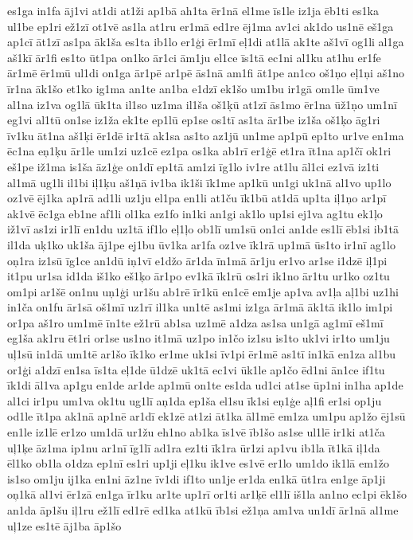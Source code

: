 {es1ga
in1fa
āj1vi
at1di
at1ži
ap1bā
ah1ta
ēr1nā
el1me
īs1le
iz1ja
ēb1ti
es1ka
ul1be
ep1ri
ež1zī
ot1vē
as1la
at1ru
er1mā
ed1re
ēj1ma
av1ci
ak1do
us1nē
eš1ga
ap1cī
āt1zī
as1pa
āk1ša
es1ta
ib1lo
er1ģi
ēr1mī
eļ1di
at1lā
ak1te
aš1vī
og1li
al1ga
aš1kī
ār1fi
es1to
ūt1pa
on1ko
ār1ci
ām1ju
el1ce
īs1tā
ec1ni
al1ku
at1hu
er1fe
ār1mē
ēr1mū
ul1di
on1ga
ār1pē
ar1pē
ās1nā
am1fi
āt1pe
an1co
oš1ņo
eļ1ņi
aš1no
īr1na
āk1šo
et1ko
ig1ma
an1te
an1ba
e1dzī
ek1šo
um1bu
ir1gā
om1le
ūm1ve
al1na
iz1va
og1lā
ūk1ta
il1so
uz1ma
il1ša
oš1ķū
at1zī
ās1mo
ēr1na
ūž1ņo
um1nī
eg1vi
al1tū
on1se
iz1ža
ek1te
ep1lū
ep1se
os1tī
as1ta
ār1be
iz1ša
oš1ķo
āg1ri
īv1ku
āt1na
aš1ķi
ēr1dē
ir1tā
ak1sa
as1to
az1jū
un1me
ap1pū
ep1to
ur1ve
en1ma
ēc1na
eņ1ķu
ār1le
um1zi
uz1cē
ez1pa
os1ka
ab1rī
er1ģē
et1ra
īt1na
ap1čī
ok1ri
eš1pe
iž1ma
is1ša
āz1ģe
on1dī
ep1tā
am1zi
īg1lo
iv1re
at1lu
āl1ci
ez1vā
iz1ti
al1mā
ug1li
il1bi
iļ1ķu
aš1ņā
iv1ba
ik1ši
īk1me
ap1kū
un1gi
uk1nā
al1vo
up1lo
oz1vē
ēj1ka
ap1rā
ad1li
uz1ju
el1pa
en1li
at1ču
īk1bū
at1dā
up1ta
iļ1ņo
ar1pī
ak1vē
ēc1ga
eb1ne
af1li
ol1ka
ez1fo
in1ki
an1gi
ak1lo
up1si
ej1va
ag1tu
ek1ļo
iž1vī
as1zi
ir1lī
en1du
uz1tā
if1lo
eļ1ļo
ob1lī
um1sū
on1ci
an1de
es1lī
ēb1si
ib1tā
il1da
uķ1ko
uk1ša
āj1pe
ej1bu
ūv1ka
ar1fa
oz1ve
īk1rā
up1mā
ūs1to
ir1nī
ag1lo
oņ1ra
iz1sū
īg1ce
an1dū
iņ1vī
e1džo
ār1da
īn1mā
ār1ju
er1vo
ar1se
i1dzē
iļ1pi
it1pu
ur1sa
id1da
iš1ko
eš1ķo
ār1po
ev1kā
īk1rū
os1ri
ik1no
ār1tu
ur1ko
oz1tu
om1pi
ar1šē
on1nu
uņ1ģi
ur1šu
ab1rē
īr1kū
en1cē
em1je
ap1va
av1ļa
aļ1bi
uz1hi
in1ča
on1fu
ār1sā
oš1mī
uz1rī
il1ka
un1tē
as1mi
iz1ga
ār1mā
āk1tā
ik1lo
im1pi
or1pa
aš1ro
um1mē
īn1te
ež1rū
ab1sa
uz1mē
a1dza
as1sa
un1gā
ag1mī
eš1mī
eg1ša
ak1ru
ēt1ri
or1se
us1no
it1mā
uz1po
in1čo
iz1su
is1to
uk1vi
ir1to
um1ju
uļ1sū
in1dā
um1tē
ar1šo
īk1ko
er1me
uk1si
īv1pi
ēr1mē
as1tī
in1kā
en1za
al1bu
or1ģi
a1dzī
en1sa
īs1ta
eļ1de
ū1dzē
uk1tā
ec1vi
ūk1le
ap1čo
ēd1ni
ān1ce
if1tu
īk1di
āl1va
ap1gu
en1de
ar1de
ap1mū
on1te
es1da
ud1ci
at1se
ūp1ni
in1ha
ap1de
al1ci
ir1pu
um1va
ok1tu
ug1lī
aņ1da
ep1ša
el1su
īk1si
eņ1ģe
aļ1fi
er1si
op1ju
od1le
īt1pa
ak1nā
ap1nē
ar1dī
ek1zē
at1zi
āt1ka
āl1mē
em1za
um1pu
ap1žo
ēj1sū
en1le
iz1lē
er1zo
um1dā
ur1žu
eh1no
ab1ka
īs1vē
īb1šo
as1se
ul1lē
ir1ki
at1ča
uļ1ķe
āz1ma
ip1nu
ar1nī
īg1lī
ad1ra
ez1ti
īk1ra
ūr1zi
ap1vu
ib1la
īt1kā
iļ1da
ēl1ko
ob1la
o1dza
ep1nī
es1ri
up1ji
eļ1ku
ik1ve
es1vē
er1lo
um1do
ik1lā
em1žo
is1so
om1ju
ij1ka
en1ni
āz1ne
īv1di
if1to
un1je
er1da
en1kā
ūt1ra
en1ge
āp1ji
oņ1kā
al1vi
ēr1zā
en1ga
īr1ku
ar1te
up1rī
or1ti
ar1ķē
el1lī
iš1la
an1no
ec1pi
ēk1šo
an1da
āp1šu
iļ1ru
ež1lī
ed1rē
ed1ka
at1kū
īb1si
ež1ņa
am1va
un1dī
ār1nā
al1me
uļ1ze
es1tē
āj1ba
āp1šo
}
